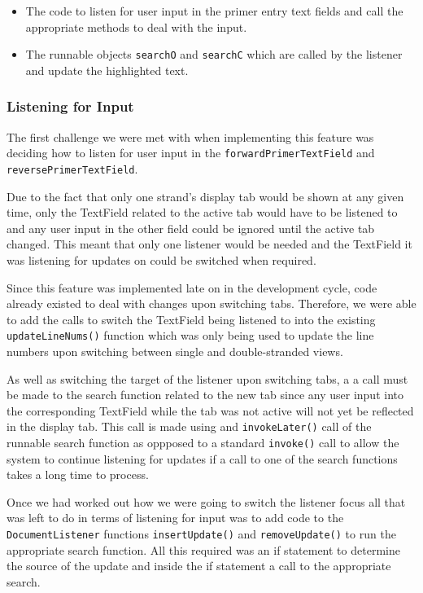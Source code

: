 \begin{itemize}
\item The code to listen for user input in the primer entry text fields
and call the appropriate methods to deal with the input.
\item The runnable objects \texttt{searchO} and \texttt{searchC} which
are called by the listener and update the highlighted text.
\end{itemize}

\subsubsection{Listening for Input}

The first challenge we were met with when implementing this feature was
deciding how to listen for user input in the
\texttt{forwardPrimerTextField} and \texttt{reversePrimerTextField}.

Due to the fact that only one strand's display tab would be shown at any
given time, only the TextField related to the active tab would have to
be listened to and any user input in the other field could be ignored
until the active tab changed. This meant that only one listener would be
needed and the TextField it was listening for updates on could be
switched when required.

Since this feature was implemented late on in the development cycle,
code already existed to deal with changes upon switching tabs.
Therefore, we were able to add the calls to switch the TextField being
listened to into the existing \texttt{updateLineNums()} function which
was only being used to update the line numbers upon switching between
single and double-stranded views.

As well as switching the target of the listener upon switching tabs, a
a call must be made to the search function related to the new tab
since any user input into the corresponding TextField while the tab was
not active will not yet be reflected in the display tab. This call is
made using and \texttt{invokeLater()} call of the runnable search
function as oppposed to a standard \texttt{invoke()} call to allow the
system to continue listening for updates if a call to one of the search
functions takes a long time to process.

Once we had worked out how we were going to switch the listener focus
all that was left to do in terms of listening for input was to add code
to the \texttt{DocumentListener} functions \texttt{insertUpdate()} and
\texttt{removeUpdate()} to run the appropriate search function. All this
required was an if statement to determine the source of the update and
inside the if statement a call to the appropriate search.

